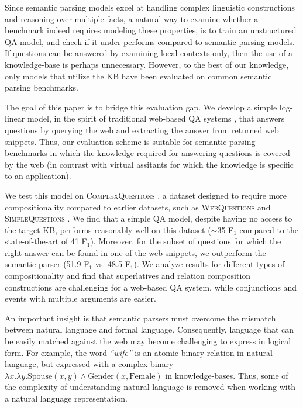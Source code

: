 \documentclass[11pt,a4paper]{article}
\newcommand\nl[1]{{\it``#1''}}
\begin{document}
Since semantic parsing models excel at handling complex linguistic constructions and reasoning over multiple facts, a natural way to examine whether a benchmark indeed requires modeling these properties, is to train an unstructured QA model, and check if it under-performs compared to semantic parsing models.
If questions can be answered by examining local contexts only, then the use of a knowledge-base is perhaps unnecessary. However, to the best of our knowledge, only models that utilize the KB have been evaluated on common semantic parsing benchmarks. 

The goal of this paper is to bridge this evaluation gap. We develop a simple log-linear model, in the spirit of traditional web-based QA systems \cite{kwok2001scaling,brill2002askmsr}, that answers questions by querying the web and extracting the answer from returned web snippets. Thus, our evaluation scheme is suitable for semantic parsing benchmarks in which the knowledge required for answering questions is covered by the web (in contrast with virtual assitants for which the knowledge is specific to an application).

We test this model on \textsc{ComplexQuestions} \cite{bao2016constraint}, a dataset designed to
require more compositionality 
compared to earlier datasets, such as \textsc{WebQuestions} \cite{berant2013freebase} and \textsc{SimpleQuestions} \cite{bordes2015simple}. 
We find that a simple QA model, despite having no access to the target KB, performs reasonably well on this dataset ($\sim$35 F$_1$ compared to the state-of-the-art of 41 F$_1$).
Moreover, for the subset of questions for which the right answer can be found in one of the web snippets, we outperform the semantic parser (51.9 F$_1$ vs. 48.5 F$_1$).
We analyze results for different types of compositionality and find that superlatives and relation composition constructions are challenging for a web-based QA system, while conjunctions and events with multiple arguments are easier.

An important insight is that semantic parsers must overcome the mismatch between natural language and formal language. Consequently, language that can be easily matched against the web may become challenging to express in logical form. For example, the word \nl{wife} is an atomic binary relation in natural language, but expressed with a complex binary $\lambda x. \lambda y. \mbox{Spouse}(x, y) \land \mbox{Gender}(x, \mbox{Female})$ in knowledge-bases. Thus, some of the complexity of understanding natural language is removed when working with a natural language representation.
\end{document}
